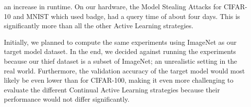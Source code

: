 an increase in runtime. On our hardware, the Model Stealing Attacks for CIFAR-10 and MNIST which used \gls{badge}, had a query time of about four days. This is
significantly more than all the other Active Learning strategies. \par
Initially, we planned to compute the same experiments using ImageNet as our target model dataset. In the end, we decided against running the experiments
because our thief dataset is a subset of ImageNet; an unrealistic setting in the real world. Furthermore, the validation accuracy of the target model
would most likely be even lower than for CIFAR-100, making it even more challenging to evaluate the different Continual Active Learning strategies because their
performance would not differ significantly.

